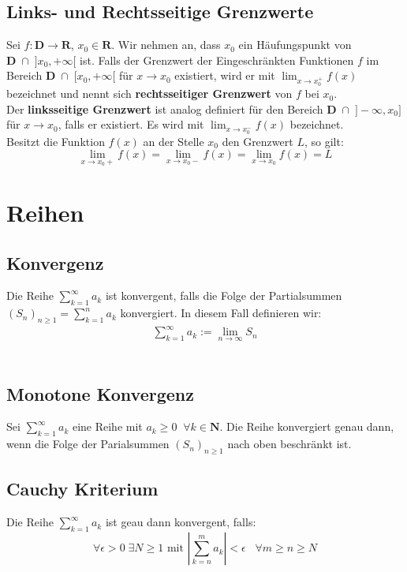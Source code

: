 \documentclass[8pt]{article}
\begin{document}
\begin{multicols*}{3}
 \subsection{Links- und Rechtsseitige Grenzwerte}
Sei $f: \mathbf{D} \rightarrow \mathbf{R}$, $x_0 \in \mathbf{R}$. Wir nehmen an, dass
$x_0$ ein Häufungspunkt von $\mathbf{D} \;\cap\; ]x_0, +\infty[$ ist. Falls der Grenzwert
der Eingeschränkten Funktionen $f$ im Bereich $\mathbf{D} \;\cap\; [x_0, +\infty[$ für
$x \rightarrow x_0$ existiert, wird er mit $\lim_{x \rightarrow x_0^+} f(x)$ bezeichnet und
nennt sich \textbf{rechtsseitiger Grenzwert} von $f$ bei $x_0$.\\
Der \textbf{linksseitige Grenzwert} ist analog definiert für den Bereich $\mathbf{D} \;\cap\; ]-\infty, x_0]$
für $x \rightarrow x_0$, falls er existiert. Es wird mit $\lim_{x \rightarrow x_0^-} f(x)$ bezeichnet.\\
Besitzt die Funktion $f(x)$ an der Stelle $x_0$ den Grenzwert $L$, so gilt:
$$
  \lim_{x \rightarrow x_0+} f(x) = \lim_{x \rightarrow x_0-} f(x) = \lim_{x \rightarrow x_0} f(x) = L
$$
\section{Reihen}
\hypertarget{sec:1}{}
  \subsection{Konvergenz}
Die Reihe $\sum_{k = 1}^{\infty} a_k$ ist konvergent, falls die Folge der
Partialsummen $(S_n)_{n \geq 1} = \sum_{k = 1}^{n} a_k$
konvergiert. In diesem Fall definieren wir:
\begin{align*}
  \sum_{k = 1}^{\infty} a_k := \lim_{n \rightarrow \infty} S_n
\end{align*}\\
  \subsection {Monotone Konvergenz}
Sei $\sum_{k = 1}^\infty a_k$ eine Reihe mit $a_k \geq 0 \;\; \forall k \in \mathbf{N}$.
Die Reihe konvergiert genau dann, wenn die Folge der Parialsummen $(S_n)_{n \geq 1}$ nach
oben beschränkt ist.
\subsection{Cauchy Kriterium}
Die Reihe $\sum_{k = 1}^{\infty} a_k$ ist geau dann konvergent, falls:
$$
  \forall \epsilon > 0 \; \exists N \geq 1 \text{ mit } \left| \sum_{k = n}^m a_k \right| < \epsilon \; \; \; \forall m \geq n \geq N
$$

\end{multicols*}
\end{document}
